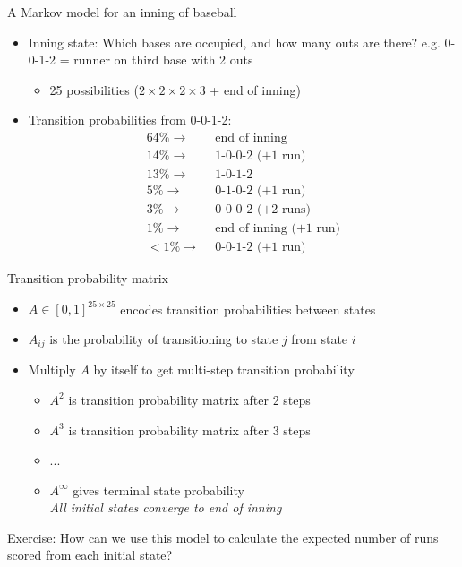 \documentclass[handout]{beamer}
\begin{document}
\begin{frame}{A Markov model for an inning of baseball}
  \begin{itemize}
    \item Inning state: Which bases are occupied, and how many outs are there? e.g. 0-0-1-2 = runner on third base with 2 outs
    \pause
    \begin{itemize}
      \item 25 possibilities ($2 \times 2 \times 2 \times 3$ + end of inning)
    \end{itemize}
    \pause
    \item Transition probabilities from 0-0-1-2:
    \pause
    \begin{align*}
      64\% \rightarrow   ~&~ \mbox{end of inning}\\
      14\% \rightarrow   ~&~ \mbox{1-0-0-2 (+1 run)}\\
      13\% \rightarrow    ~&~ \mbox{1-0-1-2}\\
      5\% \rightarrow    ~&~ \mbox{0-1-0-2 (+1 run)}\\
      3\% \rightarrow    ~&~ \mbox{0-0-0-2 (+2 runs)}\\
      1\% \rightarrow   ~&~ \mbox{end of inning (+1 run)}\\
      <1\% \rightarrow   ~&~ \mbox{0-0-1-2 (+1 run)}
    \end{align*}
  \end{itemize}
\end{frame}

\begin{frame}{Transition probability matrix}
  \begin{itemize}
    \item $A \in [0, 1]^{25\times25}$ encodes transition probabilities between states
    \item $A_{ij}$ is the probability of transitioning to state $j$ from state $i$
    \pause
    \item Multiply $A$ by itself to get multi-step transition probability
    \begin{itemize}
      \item $A^2$ is transition probability matrix after 2 steps
      \item $A^3$ is transition probability matrix after 3 steps
      \item ...
      \item $A^\infty$ gives terminal state probability\\
      {\it All initial states converge to end of inning}
    \end{itemize}
  \end{itemize}
  \pause
  \vfill
  Exercise: How can we use this model to calculate the expected number of runs scored from each initial state?
\end{frame}
\end{document}
